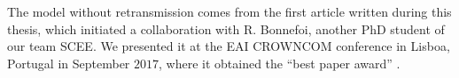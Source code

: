 The model without retransmission comes from the first article written during this thesis, which initiated a collaboration with R. Bonnefoi, another PhD student of our team SCEE.
We presented it at the EAI CROWNCOM conference in Lisboa, Portugal in September $2017$, where it obtained the ``best paper award'' \cite{Bonnefoi17}.
%
